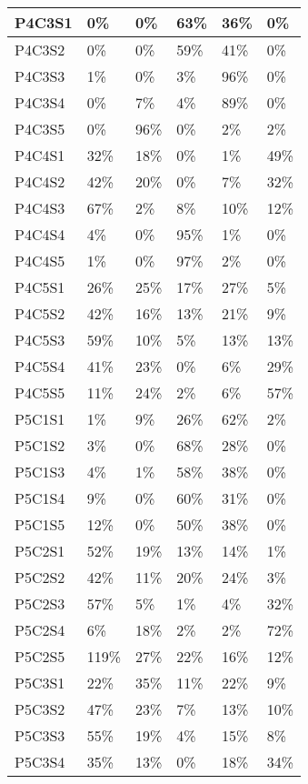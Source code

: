 \begin{longtable}{|l|l|l|l|l|l|}
P4C3S1 & 0\% & 0\% & 63\% & 36\% & 0\% \\ \hline
P4C3S2 & 0\% & 0\% & 59\% & 41\% & 0\% \\ \hline
P4C3S3 & 1\% & 0\% & 3\% & 96\% & 0\% \\ \hline
P4C3S4 & 0\% & 7\% & 4\% & 89\% & 0\% \\ \hline
P4C3S5 & 0\% & 96\% & 0\% & 2\% & 2\% \\ \hline
P4C4S1 & 32\% & 18\% & 0\% & 1\% & 49\% \\ \hline
P4C4S2 & 42\% & 20\% & 0\% & 7\% & 32\% \\ \hline
P4C4S3 & 67\% & 2\% & 8\% & 10\% & 12\% \\ \hline
P4C4S4 & 4\% & 0\% & 95\% & 1\% & 0\% \\ \hline
P4C4S5 & 1\% & 0\% & 97\% & 2\% & 0\% \\ \hline
P4C5S1 & 26\% & 25\% & 17\% & 27\% & 5\% \\ \hline
P4C5S2 & 42\% & 16\% & 13\% & 21\% & 9\% \\ \hline
P4C5S3 & 59\% & 10\% & 5\% & 13\% & 13\% \\ \hline
P4C5S4 & 41\% & 23\% & 0\% & 6\% & 29\% \\ \hline
P4C5S5 & 11\% & 24\% & 2\% & 6\% & 57\% \\ \hline
P5C1S1 & 1\% & 9\% & 26\% & 62\% & 2\% \\ \hline
P5C1S2 & 3\% & 0\% & 68\% & 28\% & 0\% \\ \hline
P5C1S3 & 4\% & 1\% & 58\% & 38\% & 0\% \\ \hline
P5C1S4 & 9\% & 0\% & 60\% & 31\% & 0\% \\ \hline
P5C1S5 & 12\% & 0\% & 50\% & 38\% & 0\% \\ \hline
P5C2S1 & 52\% & 19\% & 13\% & 14\% & 1\% \\ \hline
P5C2S2 & 42\% & 11\% & 20\% & 24\% & 3\% \\ \hline
P5C2S3 & 57\% & 5\% & 1\% & 4\% & 32\% \\ \hline
P5C2S4 & 6\% & 18\% & 2\% & 2\% & 72\% \\ \hline
P5C2S5 & 119\% & 27\% & 22\% & 16\% & 12\% \\ \hline
P5C3S1 & 22\% & 35\% & 11\% & 22\% & 9\% \\ \hline
P5C3S2 & 47\% & 23\% & 7\% & 13\% & 10\% \\ \hline
P5C3S3 & 55\% & 19\% & 4\% & 15\% & 8\% \\ \hline
P5C3S4 & 35\% & 13\% & 0\% & 18\% & 34\% \\ \hline

\end{longtable}

